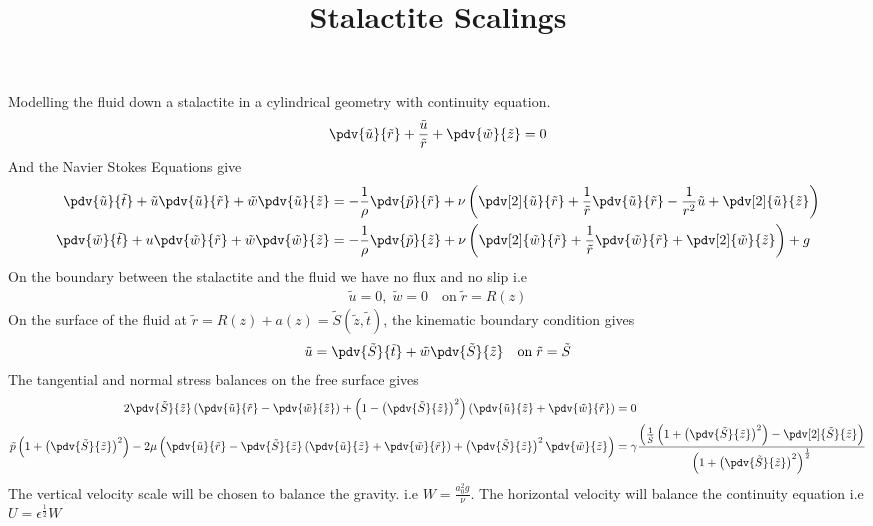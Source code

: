 \documentclass[12pt]{article}
\title{Stalactite Scalings}
\newcommand{\rt}{^{\frac{1}{2}}}
\begin{document}
	Modelling the fluid down a stalactite in a cylindrical geometry with continuity equation.
\begin{align}
\pdv{\tilde u}{\tilde r}+\frac{\tilde u}{\tilde r}+\pdv{\tilde w}{\tilde z}=0 \label{continuity}
\end{align}
And the Navier Stokes Equations give
\begin{align}
\pdv{\tilde u}{\tilde t}+\tilde u\pdv{\tilde u}{\tilde r}+\tilde w\pdv{\tilde u}{\tilde z}&=-\frac{1}{\rho}\pdv{\tilde p}{\tilde r}+\nu\left(\pdv[2]{\tilde u}{\tilde r}+\frac{1}{\tilde r}\pdv{\tilde u}{\tilde r}-\frac{1}{r^2}\tilde u+\pdv[2]{\tilde u}{\tilde z}\right)\label{navierr}\\
\pdv{\tilde w}{\tilde t}+u\pdv{\tilde w}{\tilde r}+\tilde w\pdv{\tilde w}{\tilde z}&=-\frac{1}{\rho}\pdv{\tilde p}{\tilde z}+\nu\left(\pdv[2]{\tilde w}{\tilde r}+\frac{1}{\tilde r}\pdv{\tilde w}{\tilde r}+\pdv[2]{\tilde w}{\tilde z}\right) + g \label{navierv}
\end{align}
On the boundary between the stalactite and the fluid we have no flux and no slip i.e
\begin{align}
\tilde u=0,\;\tilde  w=0\quad\mathrm{on}\; \tilde r=R(z) \label{solidboundary}
\end{align}
On the surface of the fluid at $\tilde r=R(z)+a(z)=\tilde S(\tilde z,\tilde t)$, the kinematic boundary condition gives
\begin{align}
\tilde   u=\pdv{\tilde S}{\tilde t}+\tilde w\pdv{\tilde S}{\tilde z} \quad\mathrm{on}\;\tilde  r=\tilde S \label{kinematic}
\end{align}
The tangential and normal stress balances on the free surface gives
\footnotesize
\begin{align}
2\pdv{\tilde S}{\tilde z}\left(\pdv{\tilde u}{\tilde r}-\pdv{\tilde w}{\tilde z}\right)+\left(1-\left(\pdv{\tilde S}{\tilde z}\right)^2\right)\left(\pdv{\tilde u}{\tilde z}+\pdv{\tilde w}{\tilde r}\right)&=0\label{tangstress}\\
\tilde p\left(1+\left(\pdv{\tilde S}{\tilde z}\right)^2\right)-2\mu\left( \pdv{\tilde u}{\tilde r}-\pdv{\tilde S}{\tilde z}\left(\pdv{\tilde u}{\tilde z}+\pdv{\tilde w}{\tilde r}\right)+\left(\pdv{\tilde S}{\tilde z}\right)^2\pdv{\tilde w}{\tilde z}\right)&=\gamma\frac{\left(\frac{1}{\tilde S}\left(1+\left(\pdv{\tilde S}{\tilde z}\right)^2\right)-\pdv[2]{\tilde S}{\tilde z}\right)}{\left(1+\left(\pdv{\tilde S}{\tilde z}\right)^2\right)^{\frac{1}{2}}}\label{normstress}
\end{align}
\normalsize
The vertical velocity scale will be chosen to balance the gravity. i.e $W = \frac{a_0^2g}{\nu}$. The horizontal velocity will balance the continuity equation i.e $U  =\epsilon\rt W$
\end{document}
